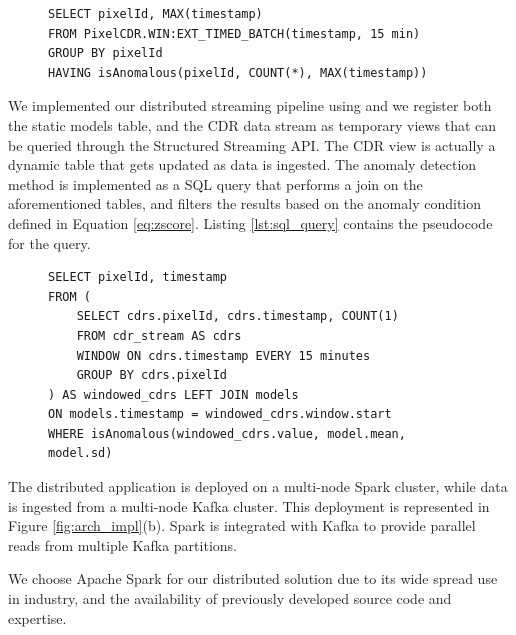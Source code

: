 {\begin{figure}[ht]
\begin{minipage}{0.95\linewidth}
\begin{lstlisting}[caption={EPL query performed by Esper Processor.},frame=single,captionpos=b,label=lst:epl_query,style=ESPER]
SELECT pixelId, MAX(timestamp)
FROM PixelCDR.WIN:EXT_TIMED_BATCH(timestamp, 15 min) 
GROUP BY pixelId 
HAVING isAnomalous(pixelId, COUNT(*), MAX(timestamp))
\end{lstlisting}
\end{minipage}
\end{figure}

We implemented our distributed streaming pipeline using \sparkdi{} and we register both the static models table, and the CDR data stream as temporary views that can be queried through the Structured Streaming API. The CDR view is actually a dynamic table that gets updated as data is ingested. The anomaly detection method is implemented as a SQL query that performs a join on the aforementioned tables, and filters the results based on the anomaly condition defined in Equation \eqref{eq:zscore}. Listing \ref{lst:sql_query} contains the pseudocode for the query.

\begin{figure}[ht]
\begin{minipage}{0.95\linewidth}
\begin{lstlisting}[caption={Spark SQL anomaly detection query.},frame=single,captionpos=b,label=lst:sql_query,style=SPARKSQL]
SELECT pixelId, timestamp
FROM (
	SELECT cdrs.pixelId, cdrs.timestamp, COUNT(1)
	FROM cdr_stream AS cdrs
	WINDOW ON cdrs.timestamp EVERY 15 minutes
	GROUP BY cdrs.pixelId
) AS windowed_cdrs LEFT JOIN models 
ON models.timestamp = windowed_cdrs.window.start 
WHERE isAnomalous(windowed_cdrs.value, model.mean, model.sd)
\end{lstlisting}
\end{minipage}
\end{figure}

The distributed application is deployed on a multi-node Spark cluster, while data is ingested from a multi-node Kafka cluster. This deployment is represented in Figure \ref{fig:arch_impl}(b). Spark is integrated with Kafka to provide parallel reads from multiple Kafka partitions. 

We choose Apache Spark for our distributed solution due to its wide spread use in industry, and the availability of previously developed source code and expertise.
}
